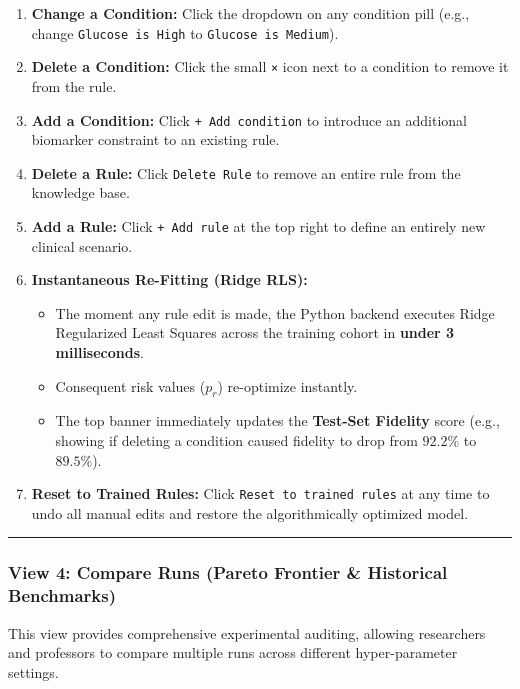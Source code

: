 \begin{enumerate}
\def\labelenumi{\arabic{enumi}.}
\tightlist
\item
  \textbf{Change a Condition:} Click the dropdown on any condition pill
  (e.g., change \texttt{Glucose\ is\ High} to
  \texttt{Glucose\ is\ Medium}).
\item
  \textbf{Delete a Condition:} Click the small \texttt{×} icon next to a
  condition to remove it from the rule.
\item
  \textbf{Add a Condition:} Click \texttt{+\ Add\ condition} to
  introduce an additional biomarker constraint to an existing rule.
\item
  \textbf{Delete a Rule:} Click \texttt{Delete\ Rule} to remove an
  entire rule from the knowledge base.
\item
  \textbf{Add a Rule:} Click \texttt{+\ Add\ rule} at the top right to
  define an entirely new clinical scenario.
\item
  \textbf{Instantaneous Re-Fitting (Ridge RLS):}

  \begin{itemize}
  \tightlist
  \item
    The moment any rule edit is made, the Python backend executes Ridge
    Regularized Least Squares across the training cohort in
    \textbf{under 3 milliseconds}.
  \item
    Consequent risk values (\(p_r\)) re-optimize instantly.
  \item
    The top banner immediately updates the \textbf{Test-Set Fidelity}
    score (e.g., showing if deleting a condition caused fidelity to drop
    from \(92.2\%\) to \(89.5\%\)).
  \end{itemize}
\item
  \textbf{Reset to Trained Rules:} Click
  \texttt{Reset\ to\ trained\ rules} at any time to undo all manual
  edits and restore the algorithmically optimized model.
\end{enumerate}

\begin{center}\rule{0.5\linewidth}{0.5pt}\end{center}

\subsubsection{View 4: Compare Runs (Pareto Frontier \& Historical
Benchmarks)}\label{view-4-compare-runs-pareto-frontier-historical-benchmarks}

This view provides comprehensive experimental auditing, allowing
researchers and professors to compare multiple runs across different
hyper-parameter settings.

